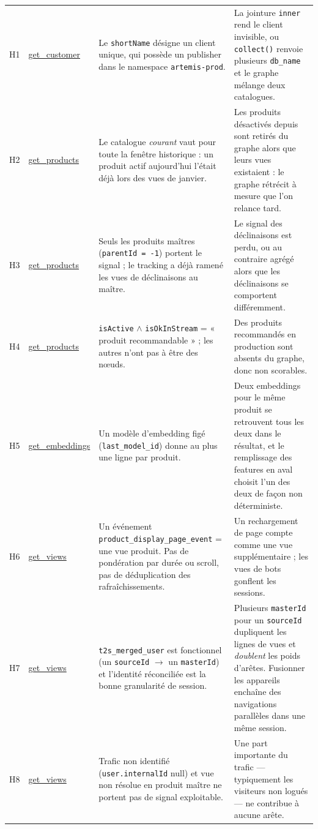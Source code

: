 \documentclass[11pt,a4paper]{article}
\newcommand{\code}[1]{\texttt{\small #1}}
\begin{document}
{\begin{longtable}{@{}l p{2.45cm} p{5.9cm} p{4.5cm}@{}}
H1 & \url{get_customer} & Le \code{shortName} désigne un client unique, qui possède un publisher dans le namespace \code{artemis-prod}. & La jointure \code{inner} rend le client invisible, ou \code{collect()} renvoie plusieurs \code{db\_name} et le graphe mélange deux catalogues. \\
\addlinespace
H2 & \url{get_products} & Le catalogue \emph{courant} vaut pour toute la fenêtre historique : un produit actif aujourd'hui l'était déjà lors des vues de janvier. & Les produits désactivés depuis sont retirés du graphe alors que leurs vues existaient : le graphe rétrécit à mesure que l'on relance tard. \\
\addlinespace
H3 & \url{get_products} & Seuls les produits maîtres (\code{parentId = -1}) portent le signal ; le tracking a déjà ramené les vues de déclinaisons au maître. & Le signal des déclinaisons est perdu, ou au contraire agrégé alors que les déclinaisons se comportent différemment. \\
\addlinespace
H4 & \url{get_products} & \code{isActive} $\land$ \code{isOkInStream} = « produit recommandable » ; les autres n'ont pas à être des nœuds. & Des produits recommandés en production sont absents du graphe, donc non scorables. \\
\addlinespace
H5 & \url{get_embeddings} & Un modèle d'embedding figé (\code{last\_model\_id}) donne au plus une ligne par produit. & Deux embeddings pour le même produit se retrouvent tous les deux dans le résultat, et le remplissage des features en aval choisit l'un des deux de façon non déterministe. \\
\addlinespace
H6 & \url{get_views} & Un événement \code{product\_display\_page\_event} = une vue produit. Pas de pondération par durée ou scroll, pas de déduplication des rafraîchissements. & Un rechargement de page compte comme une vue supplémentaire ; les vues de bots gonflent les sessions. \\
\addlinespace
H7 & \url{get_views} & \code{t2s\_merged\_user} est fonctionnel (un \code{sourceId} $\rightarrow$ un \code{masterId}) et l'identité réconciliée est la bonne granularité de session. & Plusieurs \code{masterId} pour un \code{sourceId} dupliquent les lignes de vues et \emph{doublent} les poids d'arêtes. Fusionner les appareils enchaîne des navigations parallèles dans une même session. \\
\addlinespace
H8 & \url{get_views} & Trafic non identifié (\code{user.internalId} null) et vue non résolue en produit maître ne portent pas de signal exploitable. & Une part importante du trafic --- typiquement les visiteurs non logués --- ne contribue à aucune arête. \\

\end{longtable}}
\end{document}
